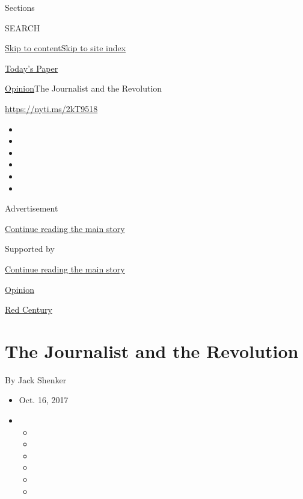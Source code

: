 Sections

SEARCH

\protect\hyperlink{site-content}{Skip to
content}\protect\hyperlink{site-index}{Skip to site index}

\href{https://myaccount.nytimes.com/auth/login?response_type=cookie\&client_id=vi}{}

\href{https://www.nytimes.com/section/todayspaper}{Today's Paper}

\href{/section/opinion}{Opinion}\textbar{}The Journalist and the
Revolution

\href{https://nyti.ms/2kT9518}{https://nyti.ms/2kT9518}

\begin{itemize}
\item
\item
\item
\item
\item
\item
\end{itemize}

Advertisement

\protect\hyperlink{after-top}{Continue reading the main story}

Supported by

\protect\hyperlink{after-sponsor}{Continue reading the main story}

\href{/section/opinion}{Opinion}

\href{/column/red-century}{Red Century}

\hypertarget{the-journalist-and-the-revolution}{%
\section{The Journalist and the
Revolution}\label{the-journalist-and-the-revolution}}

By Jack Shenker

\begin{itemize}
\item
  Oct. 16, 2017
\item
  \begin{itemize}
  \item
  \item
  \item
  \item
  \item
  \item
  \end{itemize}
\end{itemize}

